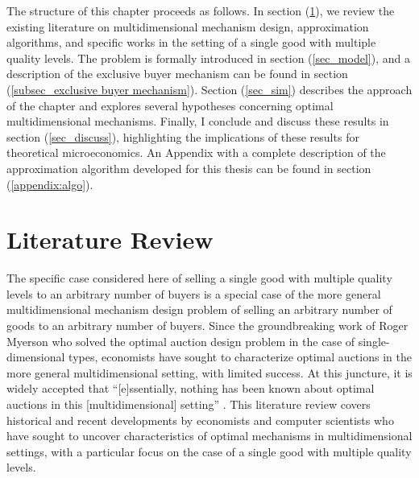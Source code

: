 \documentclass{article}
\begin{document}
The structure of this chapter proceeds as follows. In section (\ref{sec_litreview}), we review the existing literature on multidimensional mechanism design, approximation algorithms, and specific works in the setting of a single good with multiple quality levels. The problem is formally introduced in section (\ref{sec_model}), and a description of the exclusive buyer mechanism can be found in section (\ref{subsec_exclusive buyer mechanism}). Section (\ref{sec_sim}) describes the approach of the chapter and explores several hypotheses concerning optimal multidimensional mechanisms. Finally, I conclude and discuss these results in section (\ref{sec_discuss}), highlighting the implications of these results for theoretical microeconomics. An Appendix with a complete description of the approximation algorithm developed for this thesis can be found in section (\ref{appendix:algo}).








\section{Literature Review}\label{sec_litreview}


The specific case considered here of selling a single good with multiple quality levels to an arbitrary number of buyers is a special case of the more general multidimensional mechanism design problem of selling an arbitrary number of goods to an arbitrary number of buyers. Since the groundbreaking work of Roger Myerson \autocite*{myerson1981optimal} who solved the optimal auction design problem in the case of single-dimensional types, economists have sought to characterize optimal auctions in the more general multidimensional setting, with limited success. At this juncture, it is widely accepted that ``[e]ssentially, nothing has been known about optimal auctions in this [multidimensional] setting'' \autocite[p1]{kolesnikov2022}. This literature review covers historical and recent developments by economists and computer scientists who have sought to uncover characteristics of optimal mechanisms in multidimensional settings, with a particular focus on the case of a single good with multiple quality levels.
\end{document}
